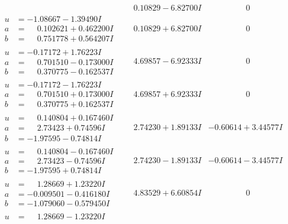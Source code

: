 \documentclass[1p]{elsarticle_modified}
\theoremstyle{definition}
\begin{document}
$$\begin{array}{c|c|c}
 & \phantom{-}0.10829 - 6.82700 I & \phantom{-0.000000 } 0 \\ \hline\begin{aligned}
u &= -1.08667 - 1.39490 I \\
a &= \phantom{-}0.102621 + 0.462200 I \\
b &= \phantom{-}0.751778 + 0.564207 I\end{aligned}
 & \phantom{-}0.10829 + 6.82700 I & \phantom{-0.000000 } 0 \\ \hline\begin{aligned}
u &= -0.17172 + 1.76223 I \\
a &= \phantom{-}0.701510 - 0.173000 I \\
b &= \phantom{-}0.370775 - 0.162537 I\end{aligned}
 & \phantom{-}4.69857 - 6.92333 I & \phantom{-0.000000 } 0 \\ \hline\begin{aligned}
u &= -0.17172 - 1.76223 I \\
a &= \phantom{-}0.701510 + 0.173000 I \\
b &= \phantom{-}0.370775 + 0.162537 I\end{aligned}
 & \phantom{-}4.69857 + 6.92333 I & \phantom{-0.000000 } 0 \\ \hline\begin{aligned}
u &= \phantom{-}0.140804 + 0.167460 I \\
a &= \phantom{-}2.73423 + 0.74596 I \\
b &= -1.97595 - 0.74814 I\end{aligned}
 & \phantom{-}2.74230 + 1.89133 I & -0.60614 + 3.44577 I \\ \hline\begin{aligned}
u &= \phantom{-}0.140804 - 0.167460 I \\
a &= \phantom{-}2.73423 - 0.74596 I \\
b &= -1.97595 + 0.74814 I\end{aligned}
 & \phantom{-}2.74230 - 1.89133 I & -0.60614 - 3.44577 I \\ \hline\begin{aligned}
u &= \phantom{-}1.28669 + 1.23220 I \\
a &= -0.009501 - 0.416180 I \\
b &= -1.079060 - 0.579450 I\end{aligned}
 & \phantom{-}4.83529 + 6.60854 I & \phantom{-0.000000 } 0 \\ \hline\begin{aligned}
u &= \phantom{-}1.28669 - 1.23220 I \\

\end{aligned}
\end{array}$$
\end{document}
